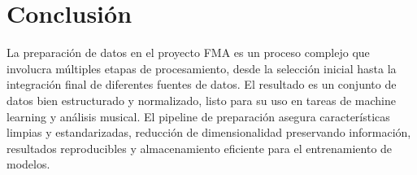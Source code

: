 \documentclass{article}
\begin{document}
\section*{Conclusión}

La preparación de datos en el proyecto FMA es un proceso complejo que involucra múltiples etapas de procesamiento, desde la selección inicial hasta la integración final de diferentes fuentes de datos. El resultado es un conjunto de datos bien estructurado y normalizado, listo para su uso en tareas de machine learning y análisis musical. El pipeline de preparación asegura características limpias y estandarizadas, reducción de dimensionalidad preservando información, resultados reproducibles y almacenamiento eficiente para el entrenamiento de modelos.
\end{document}
